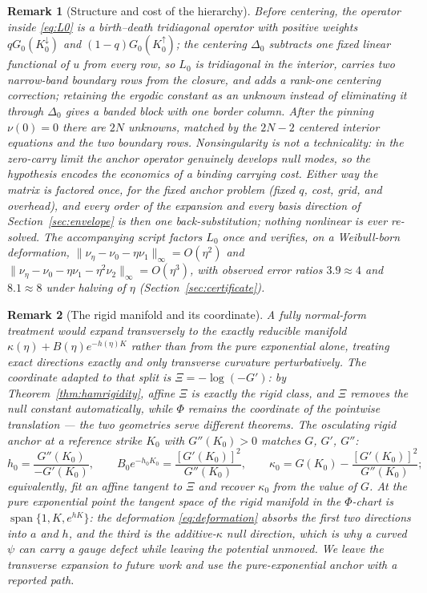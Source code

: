\documentclass[11pt]{article}
\newtheorem{remark}{Remark}
\begin{document}
\begin{remark}[Structure and cost of the hierarchy]
Before centering, the operator inside \eqref{eq:L0} is a birth--death tridiagonal operator with positive weights $qG_0(K^{\downarrow}_0)$ and $(1-q)G_0(K^{\uparrow}_0)$; the centering $\Delta_0$ subtracts one fixed linear functional of $u$ from every row, so $L_0$ is tridiagonal in the interior, carries two narrow-band boundary rows from the closure, and adds a rank-one centering correction; retaining the ergodic constant as an unknown instead of eliminating it through $\Delta_0$ gives a banded block with one border column. After the pinning $\nu(0) = 0$ there are $2N$ unknowns, matched by the $2N - 2$ centered interior equations and the two boundary rows. Nonsingularity is not a technicality: in the zero-carry limit the anchor operator genuinely develops null modes, so the hypothesis encodes the economics of a binding carrying cost. Either way the matrix is factored once, for the fixed anchor problem (fixed $q$, cost, grid, and overhead), and every order of the expansion and every basis direction of Section~\ref{sec:envelope} is then one back-substitution; nothing nonlinear is ever re-solved. The accompanying script factors $L_0$ once and verifies, on a Weibull-born deformation, $\|\nu_\eta - \nu_0 - \eta\nu_1\|_\infty = O(\eta^2)$ and $\|\nu_\eta - \nu_0 - \eta\nu_1 - \eta^2\nu_2\|_\infty = O(\eta^3)$, with observed error ratios $3.9 \approx 4$ and $8.1 \approx 8$ under halving of $\eta$ (Section~\ref{sec:certificate}).
\end{remark}

\begin{remark}[The rigid manifold and its coordinate]\label{rem:rigidmanifold}
A fully normal-form treatment would expand transversely to the exactly reducible manifold $\kappa(\eta) + B(\eta)e^{-h(\eta)K}$ rather than from the pure exponential alone, treating exact directions exactly and only transverse curvature perturbatively. The coordinate adapted to that split is $\Xi = -\log(-G')$: by Theorem~\ref{thm:hamrigidity}, affine $\Xi$ is exactly the rigid class, and $\Xi$ removes the null constant automatically, while $\Phi$ remains the coordinate of the pointwise translation --- the two geometries serve different theorems. The osculating rigid anchor at a reference strike $K_0$ with $G''(K_0) > 0$ matches $G$, $G'$, $G''$:
\[
h_0 = \frac{G''(K_0)}{-G'(K_0)}, \qquad
B_0 e^{-h_0 K_0} = \frac{[G'(K_0)]^2}{G''(K_0)}, \qquad
\kappa_0 = G(K_0) - \frac{[G'(K_0)]^2}{G''(K_0)};
\]
equivalently, fit an affine tangent to $\Xi$ and recover $\kappa_0$ from the value of $G$. At the pure exponential point the tangent space of the rigid manifold in the $\Phi$-chart is $\operatorname{span}\{1, K, e^{hK}\}$: the deformation \eqref{eq:deformation} absorbs the first two directions into $a$ and $h$, and the third is the additive-$\kappa$ null direction, which is why a curved $\psi$ can carry a gauge defect while leaving the potential unmoved. We leave the transverse expansion to future work and use the pure-exponential anchor with a reported path.
\end{remark}
\end{document}
